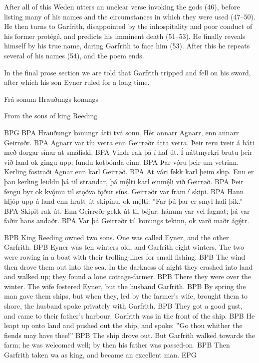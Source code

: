 After all of this Weden utters an unclear verse invoking the gods (46), before listing many of his names and the circumstances in which they were used (47–50). He then turns to Garfrith, disappointed by the inhospitality and poor conduct of his former protégé, and predicts his imminent death (51–53). He finally reveals himself by his true name, daring Garfrith to face him (53). After this he repeats several of his names (54), and the poem ends.

In the final prose section we are told that Garfrith tripped and fell on his sword, after which his son Eyner ruled for a long time.



Frá sonum Hrauðungs konungs

From the sons of king Reeding

BPG
BPA Hrauðungr konungr átti tvá sonu. Hét annarr Agnarr, enn annarr Geirrøðr.
BPA Agnarr var tíu vetra enn Geirrøðr átta vetra. Þeir reru tveir á báti með dorgar sínar at smáfiski.
BPA Vindr rak þá í haf út. Í náttmyrkri brutu þeir við land ok gingu upp; fundu kotbónda einn.
BPA Þar vǫ́ru þeir um vetrinn. Kerling fostraði Agnar enn karl Geirrøð.
BPA At vári fekk karl þeim skip. Enn er þau kerling leiddu þá til strandar, þá mę́lti karl einmę́li við Geirrøð.
BPA Þeir fengu byr ok kvǫ́mu til stǫðva fǫður síns. Geirrøðr var fram í skipi.
BPA Hann hljóp upp á land enn hratt út skipinu, ok mę́lti: ”Far þú þar er smyl hafi þik.”
BPA Skipit rak út. Enn Geirrøðr gekk út til bǿjar; hánum var vel fagnat; þá var faðir hans andaðr.
BPA Var þá Geirrøðr til konungs tekinn, ok varð maðr ágę́tr.

BPB King Reeding owned two sons. One was called Eyner, and the other Garfrith.
BPB Eyner was ten winters old, and Garfrith eight winters. The two were rowing in a boat with their trolling-lines for small fishing.
BPB The wind then drove them out into the sea. In the darkness of night they crashed into land and walked up; they found a lone cottage-farmer.
BPB There they were over the winter. The wife fostered Eyner, but the husband Garfrith.
BPB By spring the man gave them ships, but when they, led by the farmer’s wife, brought them to shore, the husband spoke privately with Garfrith.
BPB They got a good gust, and came to their father’s harbour. Garfrith was in the front of the ship.
BPB He leapt up onto land and pushed out the ship, and spoke: ”Go thou whither the fiends may have thee!”
BPB The ship drove out. But Garfrith walked towards the farm; he was welcomed well; by then his father was passed-on.
BPB Then Garfrith taken wa as king, and became an excellent man.
EPG


